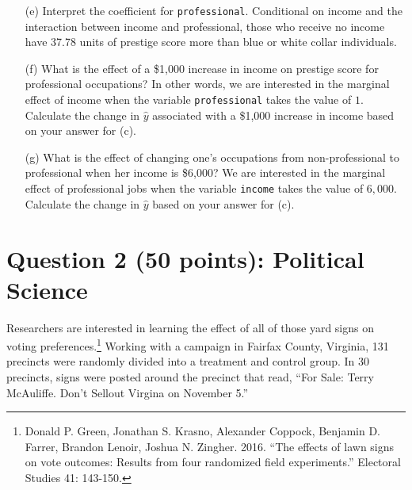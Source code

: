 \documentclass[12pt,letterpaper]{article}
\begin{document}
\begin{enumerate}
	\vspace{.5cm}	
	\item [(e)]
	Interpret the coefficient for \texttt{professional}.
	\vspace{.1cm}
	Conditional on income and the interaction between income and professional, those who receive no income have 37.78 units of prestige score more than blue or white collar individuals. 

	\vspace{.5cm}
	\item [(f)]
	What is the effect of a \$1,000 increase in income on prestige score for professional occupations? In other words, we are interested in the marginal effect of income when the variable \texttt{professional} takes the value of $1$. Calculate the change in $\hat{y}$ associated with a \$1,000 increase in income based on your answer for (c).
	  
	
	\vspace{.5cm}
	
	
	\item [(g)]
	What is the effect of changing one's occupations from non-professional to professional when her income is \$6,000? We are interested in the marginal effect of professional jobs when the variable \texttt{income} takes the value of $6,000$. Calculate the change in $\hat{y}$ based on your answer for (c).
	  
	
	
\end{enumerate}

\newpage

\section*{Question 2 (50 points): Political Science}
\vspace{.25cm}
\noindent 	Researchers are interested in learning the effect of all of those yard signs on voting preferences.\footnote{Donald P. Green, Jonathan	S. Krasno, Alexander Coppock, Benjamin D. Farrer,	Brandon Lenoir, Joshua N. Zingher. 2016. ``The effects of lawn signs on vote outcomes: Results from four randomized field experiments.'' Electoral Studies 41: 143-150. } Working with a campaign in Fairfax County, Virginia, 131 precincts were randomly divided into a treatment and control group. In 30 precincts, signs were posted around the precinct that read, ``For Sale: Terry McAuliffe. Don't Sellout Virgina on November 5.'' \\
\end{document}

